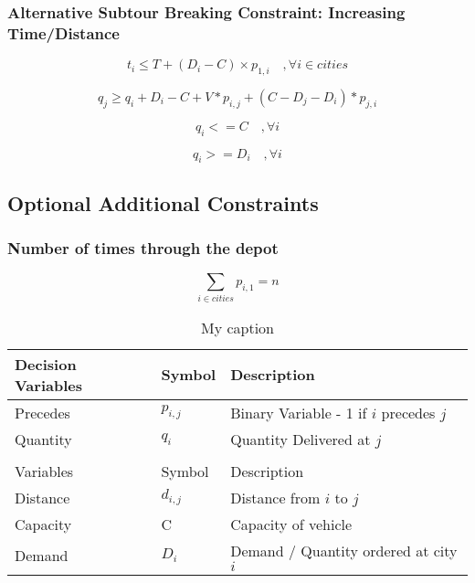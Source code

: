 \documentclass[a4paper,11pt]{article}
\begin{document}
\subsubsection{Alternative Subtour Breaking Constraint: Increasing Time/Distance}
\begin{equation}\label{T}
t_{i} \leq T + (D_{i} - C) \times  p _{1,i} \quad, \forall i \in cities
\end{equation}

\begin{equation}\label{incT}
q_{j} \geq q_{i} + D_{i} - C + V*p_{i,j}  + (C-D_{j}-D_{i})*p_{j,i}
\end{equation}

\begin{equation}
q_{i} <= C \quad, \forall i
\end{equation}

\begin{equation}
q_{i} >= D_{i} \quad, \forall i
\end{equation}


\subsection{Optional Additional Constraints}
\subsubsection{Number of times through the depot}
\begin{equation}\label{eq2}
\sum\limits_{i \in cities} p_{i,1} = n
\end{equation}

\begin{table}[h!]
\centering
\caption{My caption}
\label{variables}
\begin{tabular}{lll}
\hline
Decision Variables & Symbol & Description \\
\hline
\hline
Precedes & $p_{i,j}$  & Binary Variable - 1 if $i$ precedes $j$\\
Quantity & $q_{i}$ & Quantity Delivered at $j$ \\
\\
\hline
Variables & Symbol & Description \\
\hline
\hline
Distance & $d_{i,j}$ & Distance from $i$ to $j$  \\
Capacity & C & Capacity of vehicle \\ 
Demand & $D_{i}$ & Demand / Quantity ordered at city $i$ \\  
\end{tabular}
\end{table}
\end{document}
